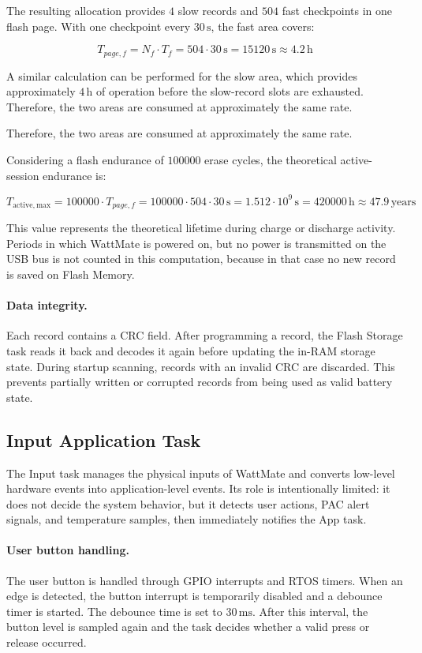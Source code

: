 The resulting allocation provides \(4\) slow records and \(504\) fast checkpoints in one flash page. With one checkpoint every \(30\,\mathrm{s}\), the fast area covers:

\[
T_{page,f} =
N_f \cdot T_f
=
504 \cdot 30\,\mathrm{s}
=
15120\,\mathrm{s}
\approx
4.2\,\mathrm{h}
\]

A similar calculation can be performed for the slow area, which provides approximately \(4\,\mathrm{h}\) of operation before the slow-record slots are exhausted. Therefore, the two areas are consumed at approximately the same rate.

Therefore, the two areas are consumed at approximately the same rate.

Considering a flash endurance of \(100000\) erase cycles, the theoretical active-session endurance is:

\[
T_{\mathrm{active,max}} =
100000 \cdot T_{page,f}
=
100000 \cdot 504 \cdot 30\,\mathrm{s}
=
1.512 \cdot 10^9\,\mathrm{s}
=
420000\,\mathrm{h}
\approx
47.9\,\mathrm{years}
\]

This value represents the theoretical lifetime during charge or discharge activity. Periods in which WattMate is powered on, but no power is transmitted on the USB bus is not counted in this computation, because in that case no new record is saved on Flash Memory.

\paragraph{Data integrity.}
Each record contains a CRC field. After programming a record, the Flash Storage task reads it back and decodes it again before updating the in-RAM storage state. During startup scanning, records with an invalid CRC are discarded. This prevents partially written or corrupted records from being used as valid battery state.


\subsection{Input Application Task}
\label{sec:input_task}

The Input task manages the physical inputs of WattMate and converts low-level hardware events into application-level events. Its role is intentionally limited: it does not decide the system behavior, but it detects user actions, PAC alert signals, and temperature samples, then immediately notifies the App task.

\paragraph{User button handling.}
The user button is handled through GPIO interrupts and RTOS timers. When an edge is detected, the button interrupt is temporarily disabled and a debounce timer is started. The debounce time is set to \(30\,\mathrm{ms}\). After this interval, the button level is sampled again and the task decides whether a valid press or release occurred.

